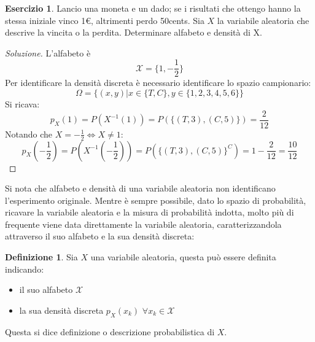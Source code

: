 \documentclass{article}
\theoremstyle{plain}
\theoremstyle{definition}
\newtheorem{definizione}{Definizione}[section]
\newtheorem{esercizio}{Esercizio}[section]
\theoremstyle{remark}
\newenvironment{soluzione}
	{\renewcommand\qedsymbol{$\mathwitch*$}\begin{proof}[Soluzione]}
	{\end{proof}}
\renewcommand{\qedsymbol}{$\mathrightghost$}
\begin{document}
\begin{esercizio}
	Lancio una moneta e un dado; se i risultati che ottengo hanno la stessa iniziale vinco 1€, altrimenti perdo 50cents. Sia $X$ la variabile aleatoria che descrive la vincita o la perdita. Determinare alfabeto e densità di X.
	\begin{soluzione}
		L'alfabeto è
		\begin{equation*}
			\mathcal{X}=\{1,-\frac{1}{2}\}
		\end{equation*}
		Per identificare la densità discreta è necessario identificare lo spazio campionario:
		\begin{equation*}
			\Omega=\{(x,y)|x\in\{T,C\}, y\in\{1,2,3,4,5,6\}\}
		\end{equation*}
		Si ricava:
		\begin{equation*}
			p_X(1)=P(X^{-1}(1))=P(\{(T,3),(C,5)\})=\frac{2}{12}
		\end{equation*}
		Notando che $X=-\frac{1}{2}\Leftrightarrow X\neq 1$:
		\begin{equation*}
			p_X(-\frac{1}{2})=P(X^{-1}(-\frac{1}{2}))=P(\{(T,3),(C,5)\}^C)=1-\frac{2}{12}=\frac{10}{12}
		\end{equation*}
	\end{soluzione}
\end{esercizio}
Si nota che alfabeto e densità di una variabile aleatoria non identificano l'esperimento originale. Mentre è sempre possibile, dato lo spazio di probabilità, ricavare la variabile aleatoria e la misura di probabilità indotta, molto più di frequente viene data direttamente la variabile aleatoria, caratterizzandola attraverso il suo alfabeto e la sua densità discreta:
\begin{definizione}
	Sia $X$ una variabile aleatoria, questa può essere definita indicando:
	\begin{itemize}
		\item il suo alfabeto $\mathcal{X}$
		\item la sua densità discreta $p_X(x_k)$ $\forall x_k\in\mathcal{X}$
	\end{itemize}
	Questa si dice definizione o descrizione probabilistica di $X$.
\end{definizione}
\end{document}
